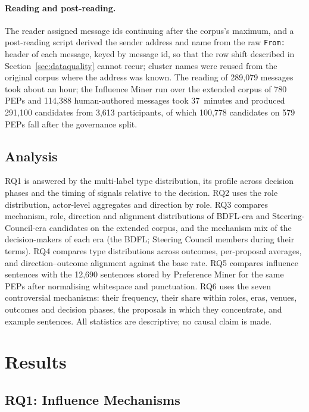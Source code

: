 \documentclass[sigconf,screen]{acmart}
\begin{document}
\paragraph{Reading and post-reading.} The reader assigned message ids continuing after the corpus's maximum, and a post-reading script derived the sender address and name from the raw \texttt{From:} header of each message, keyed by message id, so that the row shift described in Section~\ref{sec:dataquality} cannot recur; cluster names were reused from the original corpus where the address was known. The reading of 289,079 messages took about an hour; the Influence Miner run over the extended corpus of 780 PEPs and 114,388 human-authored messages took 37~minutes and produced 291,100 candidates from 3,613 participants, of which 100,778 candidates on 579 PEPs fall after the governance split.

\subsection{Analysis}

RQ1 is answered by the multi-label type distribution, its profile across decision phases and the timing of signals relative to the decision. RQ2 uses the role distribution, actor-level aggregates and direction by role. RQ3 compares mechanism, role, direction and alignment distributions of BDFL-era and Steering-Council-era candidates on the extended corpus, and the mechanism mix of the decision-makers of each era (the BDFL; Steering Council members during their terms). RQ4 compares type distributions across outcomes, per-proposal averages, and direction--outcome alignment against the base rate. RQ5 compares influence sentences with the 12,690 sentences stored by Preference Miner for the same PEPs after normalising whitespace and punctuation. RQ6 uses the seven controversial mechanisms: their frequency, their share within roles, eras, venues, outcomes and decision phases, the proposals in which they concentrate, and example sentences. All statistics are descriptive; no causal claim is made.

\section{Results}
\label{sec:results}

\subsection{RQ1: Influence Mechanisms}
\end{document}
